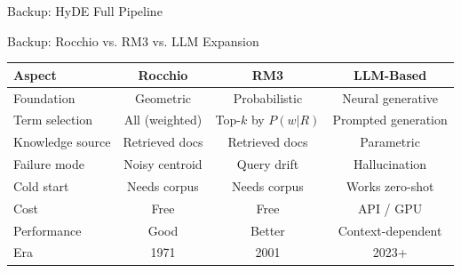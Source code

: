 \documentclass[aspectratio=169]{beamer}
\begin{document}
\begin{frame}{Backup: HyDE Full Pipeline}
\begin{center}

\end{center}
\end{frame}

\begin{frame}{Backup: Rocchio vs. RM3 vs. LLM Expansion}
\begin{table}
\centering
\footnotesize
\begin{tabular}{lccc}
\toprule
\textbf{Aspect} & \textbf{Rocchio} & \textbf{RM3} & \textbf{LLM-Based} \\
\midrule
Foundation & Geometric & Probabilistic & Neural generative \\
Term selection & All (weighted) & Top-$k$ by $P(w|R)$ & Prompted generation \\
Knowledge source & Retrieved docs & Retrieved docs & Parametric \\
Failure mode & Noisy centroid & Query drift & Hallucination \\
Cold start & Needs corpus & Needs corpus & Works zero-shot \\
Cost & Free & Free & API / GPU \\
Performance & Good & Better & Context-dependent \\
Era & 1971 & 2001 & 2023+ \\
\bottomrule
\end{tabular}
\end{table}
\end{frame}
\end{document}
